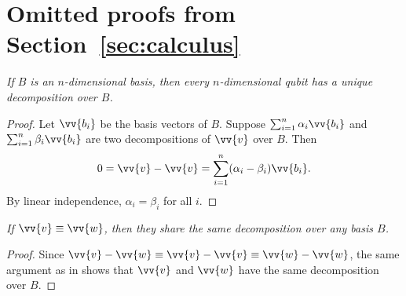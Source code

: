 \documentclass[runningheads,orivec,envcountsame,envcountsect]{llncs}
\begin{document}


%
%
%
%



\clearpage

\makeatletter
\renewcommand*\theHsection{\thesection}
\makeatother
\appendix

\section{Omitted proofs from Section~\ref{sec:calculus}}\label{sec:appendixA}

\begin{restatetheorem}
  \itshape
  If $B$ is an $n$-dimensional basis, then every $n$-dimensional qubit has
  a unique decomposition over $B$.
\end{restatetheorem}
\begin{proof}
  Let $\vv{b_i}$ be the basis vectors of $B$. Suppose
  $\sum_{i=1}^n \alpha_i \vv{b_i}$ and $\sum_{i=1}^n \beta_i \vv{b_i}$
  are two decompositions of $\vv{v}$ over $B$. Then
  \[
    0=\vv{v}-\vv{v}=\sum_{i=1}^{n}(\alpha_i-\beta_i)\vv{b_i}.
  \]
  By linear independence, $\alpha_i=\beta_i$ for all $i$.
\end{proof}

\begin{restatecorollary}
  \itshape
  If $\vv{v}\equiv\vv{w}$, then they share the same decomposition over any
  basis $B$.
\end{restatecorollary}
\begin{proof}
  Since $\vv{v}-\vv{w}\equiv\vv{v}-\vv{v}\equiv\vv{w}-\vv{w}$, the same
  argument as in  shows that $\vv{v}$ and $\vv{w}$ have the
  same decomposition over $B$.
\end{proof}
\end{document}
